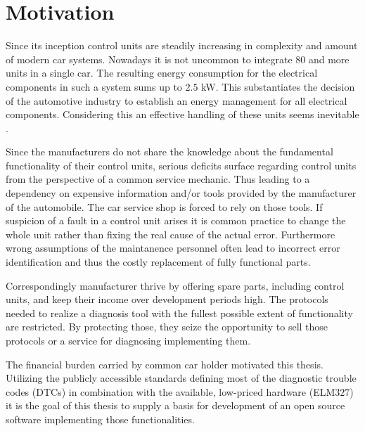 
\chapter{Motivation}
\label{sec:motivation} 

Since its inception control units are steadily increasing in complexity and amount of modern car systems. Nowadays it is not uncommon to 
integrate $80$ and more units in a single car. The resulting energy consumption for the electrical components in such a system sums up to $2.5$ kW.
This substantiates the decision of the automotive industry to establish an energy management for all electrical components. Considering this an 
effective handling of these units seems inevitable \cite{SCHAFOBD1}.

Since the manufacturers do not share the knowledge about the fundamental 
functionality of their control units, serious deficits surface regarding control units from the perspective 
of a common service mechanic. Thus leading to a dependency on expensive information and/or tools provided by the manufacturer of the automobile.
The car service shop is forced to rely on those tools. If suspicion of a fault in a control unit arises it is common practice to change the whole 
unit rather than fixing the real cause of the actual error. Furthermore wrong assumptions of the maintanence personnel often lead to incorrect 
error identification and thus the costly replacement of fully functional parts.

Correspondingly manufacturer thrive by offering spare parts, including control units, and keep their income over development periods high. The 
protocols needed to realize a diagnosis tool with the fullest possible extent of functionality are restricted. By protecting those, they seize the 
opportunity to sell those protocols or a service for diagnosing implementing them. 

The financial burden carried by common car holder motivated this thesis. Utilizing the publicly accessible standards \cite{ISO15031} defining most of the diagnostic 
trouble codes (DTCs) in combination with the available, low-priced hardware (ELM$327$) it is the goal of this thesis to supply a basis for development of 
an open source software implementing those functionalities.

